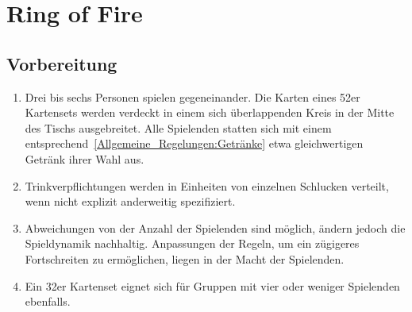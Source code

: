 \chapter{Ring of Fire}
\section{Vorbereitung}
\begin{enumerate}[label={(\arabic*)}]
	\item
	Drei bis sechs Personen spielen gegeneinander.
	Die Karten eines 52er Kartensets werden verdeckt in einem sich überlappenden Kreis in der Mitte des Tischs ausgebreitet.
	Alle Spielenden statten sich mit einem entsprechend~\ref{Allgemeine_Regelungen:Getränke} etwa gleichwertigen Getränk ihrer Wahl aus.

	\item
	Trinkverpflichtungen werden in Einheiten von einzelnen Schlucken verteilt, wenn nicht explizit anderweitig spezifiziert.

	\item
	Abweichungen von der Anzahl der Spielenden sind möglich, ändern jedoch die Spieldynamik nachhaltig. Anpassungen der Regeln, um ein zügigeres Fortschreiten zu ermöglichen, liegen in der Macht der Spielenden.

	\item
	Ein 32er Kartenset eignet sich für Gruppen mit vier oder weniger Spielenden ebenfalls.
\end{enumerate}

